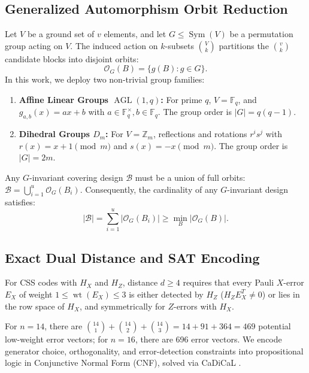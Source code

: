 \documentclass[11pt,a4paper]{article}
\begin{document}
\subsection{Generalized Automorphism Orbit Reduction}
\label{sec:orbit_framework}
Let $V$ be a ground set of $v$ elements, and let $G \le \operatorname{Sym}(V)$ be a permutation group acting on $V$. The induced action on $k$-subsets $\binom{V}{k}$ partitions the $\binom{v}{k}$ candidate blocks into disjoint orbits:
\begin{equation}
\label{eq:orbit_def}
\mathcal{O}_G(B) = \{ g(B) : g \in G \}.
\end{equation}
In this work, we deploy two non-trivial group families:
\begin{enumerate}
    \item \textbf{Affine Linear Groups $\operatorname{AGL}(1, q)$:} For prime $q$, $V = \mathbb{F}_q$, and $g_{a, b}(x) = ax + b$ with $a \in \mathbb{F}_q^\times, b \in \mathbb{F}_q$. The group order is $|G| = q(q - 1)$.
    \item \textbf{Dihedral Groups $D_m$:} For $V = \mathbb{Z}_m$, reflections and rotations $r^i s^j$ with $r(x) = x + 1 \pmod m$ and $s(x) = -x \pmod m$. The group order is $|G| = 2m$.
\end{enumerate}

Any $G$-invariant covering design $\mathcal{B}$ must be a union of full orbits: $\mathcal{B} = \bigcup_{i=1}^u \mathcal{O}_G(B_i)$. Consequently, the cardinality of any $G$-invariant design satisfies:
\begin{equation}
\label{eq:cardinality_bound}
|\mathcal{B}| = \sum_{i=1}^u |\mathcal{O}_G(B_i)| \ge \min_{B} |\mathcal{O}_G(B)|.
\end{equation}

\subsection{Exact Dual Distance and SAT Encoding}
\label{sec:sat_framework}
For CSS codes with $H_X$ and $H_Z$, distance $d \ge 4$ requires that every Pauli $X$-error $E_X$ of weight $1 \le \operatorname{wt}(E_X) \le 3$ is either detected by $H_Z$ ($H_Z E_X^T \ne 0$) or lies in the row space of $H_X$, and symmetrically for $Z$-errors with $H_X$.

For $n=14$, there are $\binom{14}{1} + \binom{14}{2} + \binom{14}{3} = 14 + 91 + 364 = 469$ potential low-weight error vectors; for $n=16$, there are 696 error vectors. We encode generator choice, orthogonality, and error-detection constraints into propositional logic in Conjunctive Normal Form (CNF), solved via CaDiCaL \cite{biere2020cadical, ignatiev2018pysat}.
\end{document}
